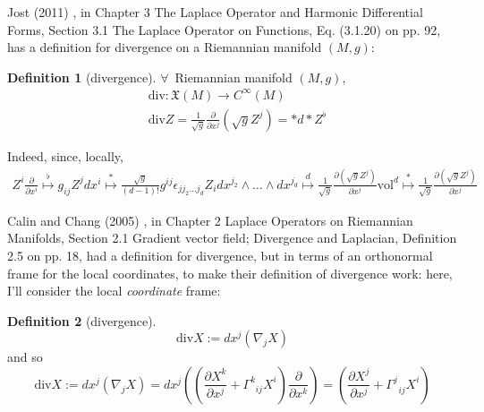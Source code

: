 \documentclass[twoside,landscape,10pt]{amsart}
\theoremstyle{plain}
\theoremstyle{definition}
\newtheorem{definition}{Definition}
\theoremstyle{remark}
\theoremstyle{remark}
\begin{document}
\begin{multicols*}{2}
Jost (2011) \cite{JJost2011}, in Chapter 3 The Laplace Operator and Harmonic Differential Forms, Section 3.1 The Laplace Operator on Functions, Eq. (3.1.20) on pp. 92, has a definition for divergence on a Riemannian manifold $(M,g)$:
\begin{definition}[divergence]
  $\forall \, $ Riemannian manifold $(M,g)$, 
\begin{equation}
  \begin{aligned}
    & \text{div}: \mathfrak{X}(M) \to C^{\infty}(M) \\ 
    & \text{div}Z = \frac{1}{\sqrt{g}} \frac{ \partial }{ \partial x^j} (\sqrt{g} Z^j ) = *d*Z^{\flat}
\end{aligned}
\end{equation}
\end{definition}
Indeed, since, locally,
\[
\begin{gathered}
  Z^i \frac{ \partial }{ \partial x^i} \overset{\flat}{\mapsto } g_{ij} Z^j dx^i \overset{*}{\mapsto } \frac{ \sqrt{g}}{ (d-1)!} g^{ij} \epsilon_{jj_2 \dots j_d} Z_i dx^{j_2} \wedge \dots \wedge dx^{j_d} \overset{d}{\mapsto } \frac{1}{\sqrt{g}} \frac{ \partial ( \sqrt{g} Z^j ) }{ \partial x^j} \text{vol}^d \overset{*}{\mapsto } \frac{1}{\sqrt{g}} \frac{ \partial (\sqrt{g} Z^j)}{ \partial x^j}
\end{gathered}
\]

Calin and Chang (2005) \cite{OCalinDChang2005}, in Chapter 2 Laplace Operators on Riemannian Manifolds, Section 2.1 Gradient vector field; Divergence and Laplacian, Definition 2.5 on pp. 18, had a definition for divergence, but in terms of an orthonormal frame for the local coordinates, to make their definition of divergence work: here, I'll consider the local \emph{coordinate} frame:
\begin{definition}[divergence]
\begin{equation}
  \text{div}X := dx^j (\nabla_j X )
\end{equation}
and so 
\[
  \text{div}X := dx^j(\nabla_j X ) = dx^j \left( \left( \frac{ \partial X^k}{ \partial x^j} + \Gamma^k_{ \; \; ij} X^i \right) \frac{ \partial }{ \partial x^k}  \right) = \left( \frac{ \partial X^j}{ \partial x^j} + \Gamma^j_{ \; \; ij} X^i \right) 
\]
\end{definition}


\end{multicols*}
\end{document}
